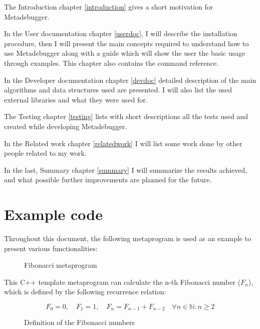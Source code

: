 The Introduction chapter \ref{introduction} gives a short motivation for
Metadebugger.

In the User documentation chapter \ref{userdoc}, I will describe the
installation procedure, then I will present the main concepts required to
understand how to use Metadebugger along with a guide which will show the user
the basic usage through examples. This chapter also contains the command
reference.

In the Developer documentation chapter \ref{devdoc} detailed description of the
main algorithms and data structures used are presented. I will also list the
used external libraries and what they were used for.

The Testing chapter \ref{testing} lists with short descriptions all the tests
used and created while developing Metadebugger.

In the Related work chapter \ref{relatedwork} I will list some work done by
other people related to my work.

In the last, Summary chapter \ref{summary} I will summarize the results
achieved, and what possible further improvements are planned for the future.

\pagebreak

\section{Example code}

Throughout this document, the following metaprogram is used as an example to
present various functionalities:

\begin{figure}[H]
    \caption{Fibonacci metaprogram}
\end{figure}

This C++ template metaprogram can calculate the n-th Fibonacci number
(\(F_n\)), which is defined by the following recurrence relation:

\begin{figure}[H]
    \[
        F_0 = 0, \quad
        F_1 = 1, \quad
        F_n = F_{n-1} + F_{n-2} \quad
        \forall n \in \mathbb{N}: n \geq 2
    \]
    \caption{Definition of the Fibonacci numbers}
\end{figure}
